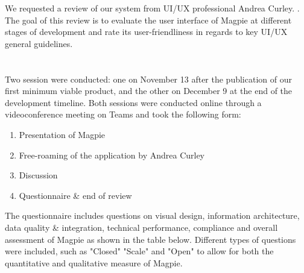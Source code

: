 We requested a review of our system from UI/UX professional Andrea Curley. .\\
The goal of this review is to evaluate the user interface of Magpie at different stages of development and rate its user-friendliness in regards to key UI/UX general guidelines.\\
 \\ \\

\noindent Two session were conducted: one on November 13 after the publication of our first minimum viable product, and the other on December 9 at the end of the development timeline. Both sessions were conducted online through a videoconference meeting on Teams and took the following form:
\begin{enumerate}
    \item Presentation of Magpie
    \item Free-roaming of the application by Andrea Curley
    \item Discussion
    \item Questionnaire \& end of review
\end{enumerate}
The questionnaire includes questions on visual design, information architecture, data quality \& integration, technical performance, compliance and overall assessment of Magpie as shown in the table below. Different types of questions were included, such as "Closed" "Scale" and "Open" to allow for both the quantitative and qualitative measure of Magpie. \\ \\
